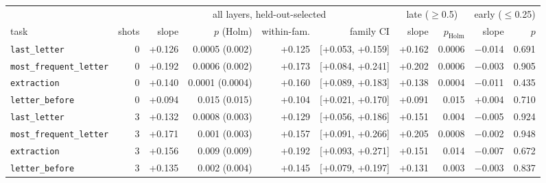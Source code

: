 \begin{tabular}{@{}lrrrrrrrrr@{}}
\toprule
 & & \multicolumn{4}{c}{all layers, held-out-selected} & \multicolumn{2}{c}{late ($\geq$0.5)} & \multicolumn{2}{c}{early ($\leq$0.25)} \\
\cmidrule(lr){3-6}\cmidrule(lr){7-8}\cmidrule(l){9-10}
task & shots & slope & $p$ (Holm) & within-fam. & family CI & slope & $p_{\text{Holm}}$ & slope & $p$ \\
\midrule
\texttt{last\_letter} & 0 & +0.126 & 0.0005 (0.002) & +0.125 & [+0.053, +0.159] & +0.162 & 0.0006 & $-$0.014 & 0.691 \\
\texttt{most\_frequent\_letter} & 0 & +0.192 & 0.0006 (0.002) & +0.173 & [+0.084, +0.241] & +0.202 & 0.0006 & $-$0.003 & 0.905 \\
\texttt{extraction} & 0 & +0.140 & 0.0001 (0.0004) & +0.160 & [+0.089, +0.183] & +0.138 & 0.0004 & $-$0.011 & 0.435 \\
\texttt{letter\_before} & 0 & +0.094 & 0.015 (0.015) & +0.104 & [+0.021, +0.170] & +0.091 & 0.015 & +0.004 & 0.710 \\
\addlinespace[2pt]
\texttt{last\_letter} & 3 & +0.132 & 0.0008 (0.003) & +0.129 & [+0.056, +0.186] & +0.151 & 0.004 & $-$0.005 & 0.924 \\
\texttt{most\_frequent\_letter} & 3 & +0.171 & 0.001 (0.003) & +0.157 & [+0.091, +0.266] & +0.205 & 0.0008 & $-$0.002 & 0.948 \\
\texttt{extraction} & 3 & +0.156 & 0.009 (0.009) & +0.192 & [+0.093, +0.271] & +0.151 & 0.014 & $-$0.007 & 0.672 \\
\texttt{letter\_before} & 3 & +0.135 & 0.002 (0.004) & +0.145 & [+0.079, +0.197] & +0.131 & 0.003 & $-$0.003 & 0.837 \\
\bottomrule
\end{tabular}